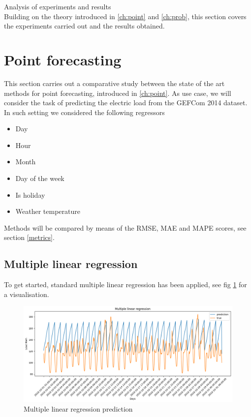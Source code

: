 Analysis of experiments and results
\\
Building on the theory introduced in \ref{ch:point} and \ref{ch:prob}, this section covers the experiments carried out and the results obtained.


\section{Point forecasting}
This section carries out a comparative study between the state of the art methods for point forecasting, introduced in \ref{ch:point}.
As use case, we will consider the task of predicting the electric load from the GEFCom 2014 dataset.
In such setting we considered the following regressors
\begin{itemize}
    \item Day
    \item Hour
    \item Month
    \item Day of the week
    \item Is holiday
    \item Weather temperature
\end{itemize}
Methods will be compared by means of the RMSE, MAE and MAPE scores, see section \ref{metrics}.
\subsection{Multiple linear regression}
To get started, standard multiple linear regression has been applied, see fig \ref{fig:mlr_price} for a visualisation. 
\begin{figure}
    \includegraphics[width=\textwidth]{images/mlr_price.png}
    \caption{Multiple linear regression prediction}
    \label{fig:mlr_price}
\end{figure}

